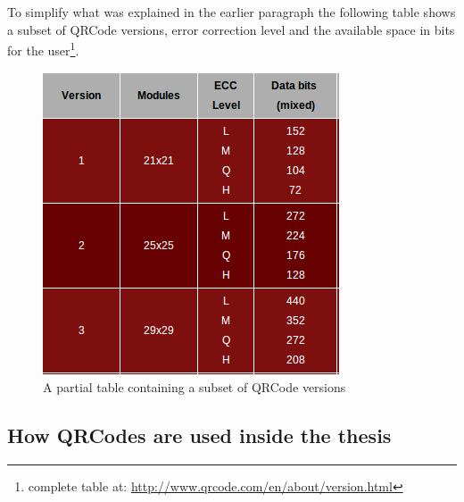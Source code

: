 \newpage
To simplify what was explained in the earlier paragraph the following table shows a subset of QRCode versions, error correction level and the available space in bits for the user\footnote{complete table at: \protect\url{http://www.qrcode.com/en/about/version.html}}.

\vspace{2.5cm}
\begin{figure}[hbt]
    \centering
    \includegraphics[scale=0.95]{img/qrversion.png}
    \caption{A partial table containing a subset of QRCode versions \label{qrversion}}
\end{figure}

\newpage

\subsection{How QRCodes are used inside the thesis}

